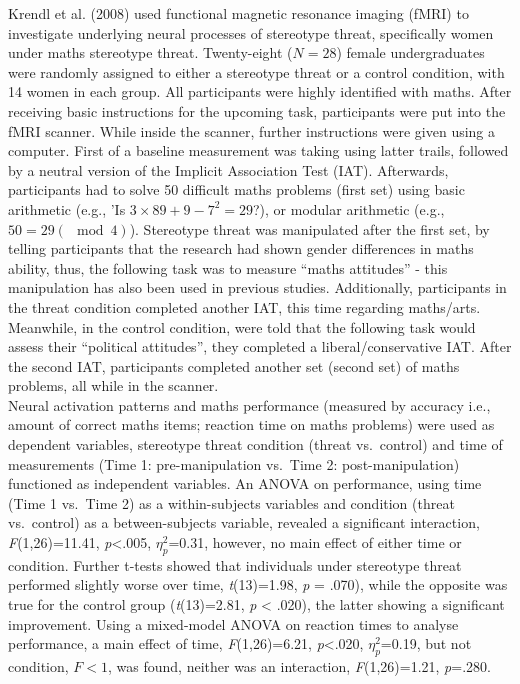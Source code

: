 \documentclass[
  stu,floatsintext]{apa7}
\begin{document}
Krendl et al. (2008) used functional magnetic resonance imaging (fMRI) to investigate underlying neural processes of stereotype threat, specifically women under maths stereotype threat.
Twenty-eight (\(N=28\)) female undergraduates were randomly assigned to either a stereotype threat or a control condition, with 14 women in each group.
All participants were highly identified with maths.
After receiving basic instructions for the upcoming task, participants were put into the fMRI scanner.
While inside the scanner, further instructions were given using a computer.
First of a baseline measurement was taking using latter trails, followed by a neutral version of the Implicit Association Test (IAT).
Afterwards, participants had to solve 50 difficult maths problems (first set) using basic arithmetic (e.g., 'Is \(3 \times 89+9-7^2 = 29\)?), or modular arithmetic (e.g., \(50=29(\mod{4})\)).
Stereotype threat was manipulated after the first set, by telling participants that the research had shown gender differences in maths ability, thus, the following task was to measure ``maths attitudes'' - this manipulation has also been used in previous studies.
Additionally, participants in the threat condition completed another IAT, this time regarding maths/arts.
Meanwhile, in the control condition, were told that the following task would assess their ``political attitudes'', they completed a liberal/conservative IAT.
After the second IAT, participants completed another set (second set) of maths problems, all while in the scanner.\\
Neural activation patterns and maths performance (measured by accuracy i.e., amount of correct maths items; reaction time on maths problems) were used as dependent variables, stereotype threat condition (threat vs.~control) and time of measurements (Time 1: pre-manipulation vs.~Time 2: post-manipulation) functioned as independent variables.
An ANOVA on performance, using time (Time 1 vs.~Time 2) as a within-subjects variables and condition (threat vs.~control) as a between-subjects variable, revealed a significant interaction, \emph{F}(1,26)=11.41, \emph{p}\textless.005, \(\eta^{2}_{p}\)=0.31, however, no main effect of either time or condition.
Further t-tests showed that individuals under stereotype threat performed slightly worse over time, \emph{t}(13)=1.98, \emph{p} = .070), while the opposite was true for the control group (\emph{t}(13)=2.81, \emph{p} \textless{} .020), the latter showing a significant improvement.
Using a mixed-model ANOVA on reaction times to analyse performance, a main effect of time, \emph{F}(1,26)=6.21, \emph{p}\textless.020, \(\eta^{2}_{p}\)=0.19, but not condition, \(F<1\), was found, neither was an interaction, \emph{F}(1,26)=1.21, \emph{p}=.280.
\end{document}
